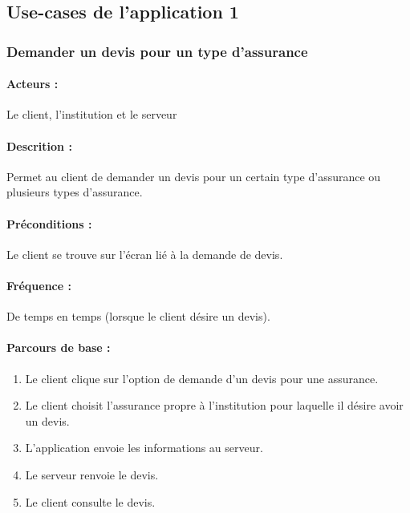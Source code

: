 \documentclass[../annexe.tex]{subfiles}
\begin{document}
\subsection{Use-cases de l'application 1}

\subsubsection{Demander un devis pour un type d'assurance}

\paragraph{Acteurs :} Le client, l'institution et le serveur 


\paragraph{Descrition :} Permet au client de demander un devis pour un certain type d'assurance ou plusieurs types d'assurance.


\paragraph{Préconditions :} Le client se trouve sur l'écran lié à la demande de devis.


\paragraph{Fréquence :} De temps en temps (lorsque le client désire un devis).



\paragraph{Parcours de base :}

	\begin{enumerate}
	
		\item Le client clique sur l'option de demande d'un devis pour une assurance.
		\item Le client choisit l'assurance propre à l'institution pour laquelle il désire avoir un devis.
		\item L'application envoie les informations au serveur.
		\item Le serveur renvoie le devis.
		\item Le client consulte le devis.
	\end{enumerate}
	
\end{document}
